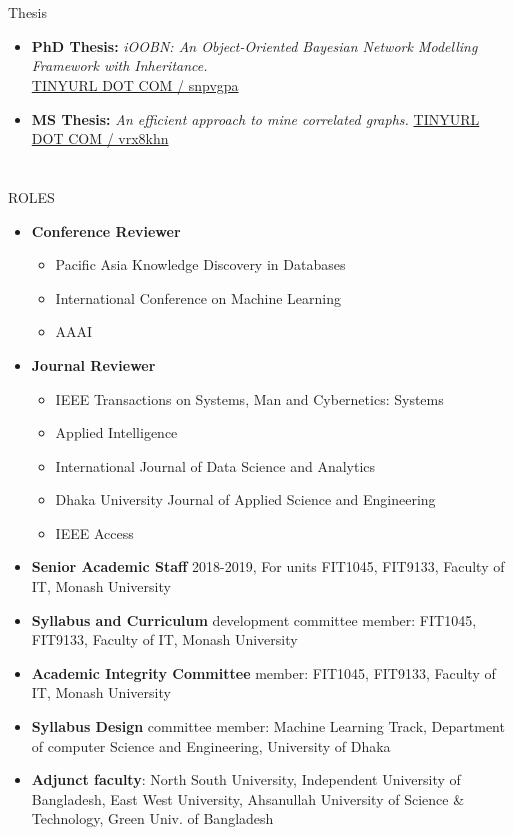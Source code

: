 \documentclass{my_cv}
\begin{document}
\section{\faBook}{Thesis}
\begin{itemize}[noitemsep]
    \item \textbf{PhD Thesis:} {\em iOOBN: An Object-Oriented Bayesian Network Modelling Framework with Inheritance.}\\ \href{https://tinyurl.com/snpvgpa}{TINYURL DOT COM / snpvgpa}
    \item \textbf{MS Thesis:} {\em An efficient approach to mine correlated graphs.} \href{https://tinyurl.com/vrx8khn}{TINYURL DOT COM / vrx8khn}
\end{itemize}

\section{\faGroup}{ROLES}
\begin{itemize}[noitemsep]
    \item \textbf{Conference Reviewer} 
        \begin{itemize}[noitemsep]
            \item Pacific Asia Knowledge Discovery in Databases
            \item International Conference on Machine Learning
            \item AAAI
        \end{itemize}
    \item \textbf{Journal Reviewer} 
    \begin{itemize}[noitemsep]
            \item IEEE Transactions on Systems, Man and Cybernetics: Systems
            \item Applied Intelligence
            \item International Journal of Data Science and Analytics
            \item Dhaka University Journal of Applied Science and Engineering
            \item IEEE Access
        \end{itemize}
    \item \textbf{Senior Academic Staff} 2018-2019, For units FIT1045, FIT9133, Faculty of IT, Monash University
    \item \textbf{Syllabus and Curriculum} development committee member: FIT1045, FIT9133, Faculty of IT, Monash University
    \item \textbf{Academic Integrity Committee} member: FIT1045, FIT9133, Faculty of IT, Monash University
    \item \textbf{Syllabus Design} committee member: Machine Learning Track, Department of computer Science and Engineering, University of Dhaka
    \item \textbf{Adjunct faculty}: North South University, Independent University of Bangladesh, East West University, Ahsanullah University of Science \& Technology, Green Univ. of Bangladesh
\end{itemize}
\end{document}
